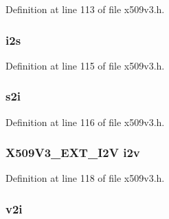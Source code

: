 Definition at line 113 of file x509v3.\+h.

\subsubsection[{\texorpdfstring{i2s}{i2s}}]{ i2s}\hypertarget{structv3__ext__method_a76fbb746e86e645d60f3f110f29d7950}{}\label{structv3__ext__method_a76fbb746e86e645d60f3f110f29d7950}


Definition at line 115 of file x509v3.\+h.

\subsubsection[{\texorpdfstring{s2i}{s2i}}]{ s2i}\hypertarget{structv3__ext__method_a6e20701bddb93ce428e53d0c8b70c48c}{}\label{structv3__ext__method_a6e20701bddb93ce428e53d0c8b70c48c}


Definition at line 116 of file x509v3.\+h.

\subsubsection[{\texorpdfstring{i2v}{i2v}}]{\setlength{\rightskip}{0pt plus 5cm}X509\+V3\+\_\+\+E\+X\+T\+\_\+\+I2V i2v}\hypertarget{structv3__ext__method_a6ddac34fd861ebf5f2e0410c767f7a3d}{}\label{structv3__ext__method_a6ddac34fd861ebf5f2e0410c767f7a3d}


Definition at line 118 of file x509v3.\+h.

\subsubsection[{\texorpdfstring{v2i}{v2i}}]{ v2i}\hypertarget{structv3__ext__method_ad869b4b6de1ec7fa615a0cee1f5317bc}{}\label{structv3__ext__method_ad869b4b6de1ec7fa615a0cee1f5317bc}


